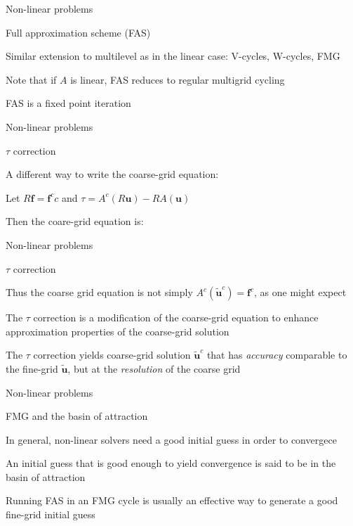 \documentclass[18pt,xcolor=table]{beamer}
\begin{document}
\begin{frame}{Non-linear problems}
\begin{block}{Full approximation scheme (FAS)}
\bit
\item Similar extension to multilevel as in the linear case: V-cycles, W-cycles, FMG
\item Note that if $A$ is linear, FAS reduces to regular multigrid cycling
\item FAS is a fixed point iteration 
\eit
\end{block}
\end{frame}

\begin{frame}{Non-linear problems}
\begin{block}{$\tau$ correction}
\bit
\item A different way to write the coarse-grid equation:
\item Let $R\mathbf{f} = \mathbf{f}^cc$ and $\tau = A^c(R\mathbf{u}) - RA(\mathbf{u})$
\item Then the coare-grid equation is:
\eit
\end{block}
\end{frame}

\begin{frame}{Non-linear problems}
\begin{block}{$\tau$ correction}
\bit
\item Thus the coarse grid equation is not simply $A^c(\mathbf{\tilde{u}}^c) = \mathbf{f}^c$, as one might expect
\item The $\tau$ correction is a modification of the coarse-grid equation to enhance approximation properties of the coarse-grid solution
\item The $\tau$ correction yields coarse-grid solution $\mathbf{\tilde{u}}^c$ that has \emph{accuracy} comparable to the fine-grid $\mathbf{\tilde{u}}$, but at the \emph{resolution} of the coarse grid
\eit
\end{block}
\end{frame}

\begin{frame}{Non-linear problems}
\begin{block}{FMG and the basin of attraction}
\bit
\item In general, non-linear solvers need a good initial guess in order to convergece
\item An initial guess that is good enough to yield convergence is said to be in the basin of attraction
\item Running FAS in an FMG cycle is usually an effective way to generate a good fine-grid initial guess
\eit
\end{block}
\end{frame}
\end{document}
